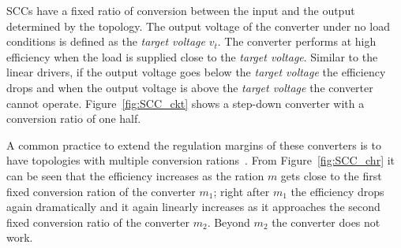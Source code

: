 SCCs have a fixed ratio of conversion between the input and the output determined by the topology. The output voltage of the converter under no load conditions is defined as the \emph{target voltage} $v_t$. The converter performs at high efficiency when the load is supplied close to the \emph{target voltage}. Similar to the linear drivers, if the output voltage goes below the \emph{target voltage} the efficiency drops and when the output voltage is above the \emph{target voltage} the converter cannot operate. Figure~\ref{fig:SCC_ckt} shows a step-down converter with a conversion ratio of one half.

A common practice to extend the regulation margins of these converters is to have topologies with multiple conversion rations~\cite{2013Ma,2013Breussegem:m_trg}. From Figure~\ref{fig:SCC_chr} it can be seen that the efficiency increases as the ration $m$ gets close to the first fixed conversion ration of the converter $m_1$; right after $m_1$ the efficiency drops again dramatically and it again linearly increases as it approaches the second fixed conversion ratio of the converter $m_2$. Beyond $m_2$ the converter does not work.


